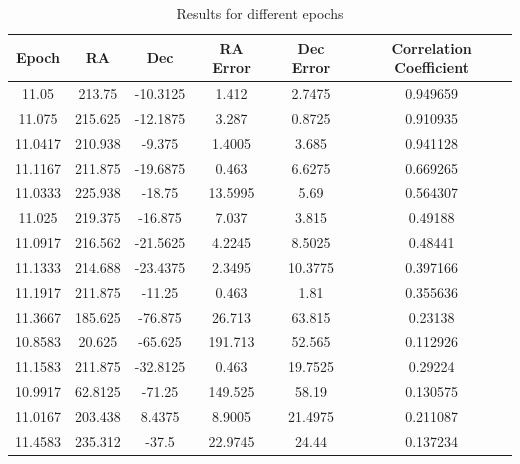 \begin{table}[h!]
	\centering
	\def\arraystretch{1.2}
	\begin{tabular}{|c c c c c c|} 
		\hline
		\textbf{Epoch} & RA & Dec & RA Error & Dec Error & Correlation Coefficient \\ [0.5ex] 
		\hline\hline
		11.05 & 213.75 & -10.3125 & 1.412 & 2.7475 & 0.949659 \\ 
		\hline
		11.075 & 215.625 & -12.1875 & 3.287 & 0.8725 & 0.910935 \\ 
		\hline
		11.0417 & 210.938 & -9.375 & 1.4005 & 3.685 & 0.941128 \\ 
		\hline
		11.1167 & 211.875 & -19.6875 & 0.463 & 6.6275 & 0.669265 \\ 
		\hline
		11.0333 & 225.938 & -18.75 & 13.5995 & 5.69 & 0.564307 \\ 
		\hline
		11.025 & 219.375 & -16.875 & 7.037 & 3.815 & 0.49188 \\ 
		\hline
		11.0917 & 216.562 & -21.5625 & 4.2245 & 8.5025 & 0.48441 \\ 
		\hline
		11.1333 & 214.688 & -23.4375 & 2.3495 & 10.3775 & 0.397166 \\ 
		\hline
		11.1917 & 211.875 & -11.25 & 0.463 & 1.81 & 0.355636 \\ 
		\hline
		11.3667 & 185.625 & -76.875 & 26.713 & 63.815 & 0.23138 \\ 
		\hline
		10.8583 & 20.625 & -65.625 & 191.713 & 52.565 & 0.112926 \\ 
		\hline
		11.1583 & 211.875 & -32.8125 & 0.463 & 19.7525 & 0.29224 \\ 
		\hline
		10.9917 & 62.8125 & -71.25 & 149.525 & 58.19 & 0.130575 \\ 
		\hline
		11.0167 & 203.438 & 8.4375 & 8.9005 & 21.4975 & 0.211087 \\ 
		\hline
		11.4583 & 235.312 & -37.5 & 22.9745 & 24.44 & 0.137234 \\
		\hline
	\end{tabular}
	\caption{Results for different epochs}
\end{table}

